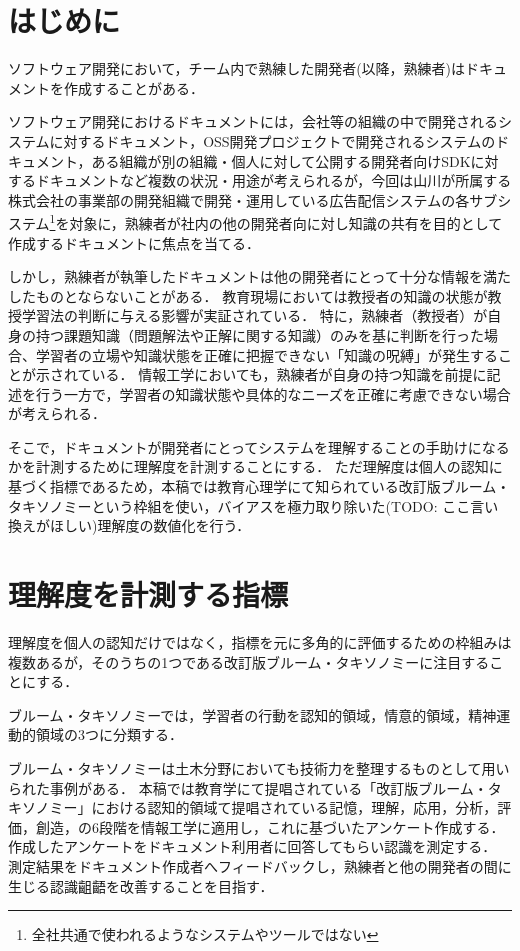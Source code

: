 \section{はじめに}
ソフトウェア開発において，チーム内で熟練した開発者(以降，熟練者)はドキュメントを作成することがある．\cite{bib:ozawa}

ソフトウェア開発におけるドキュメントには，会社等の組織の中で開発されるシステムに対するドキュメント，OSS開発プロジェクトで開発されるシステムのドキュメント，ある組織が別の組織・個人に対して公開する開発者向けSDKに対するドキュメントなど複数の状況・用途が考えられるが，今回は山川が所属する株式会社の事業部の開発組織で開発・運用している広告配信システムの各サブシステム\footnote{全社共通で使われるようなシステムやツールではない}を対象に，熟練者が社内の他の開発者向に対し知識の共有を目的として作成するドキュメントに焦点を当てる．

しかし，熟練者が執筆したドキュメントは他の開発者にとって十分な情報を満たしたものとならないことがある．
教育現場においては教授者の知識の状態が教授学習法の判断に与える影響が実証されている\cite{bib:kaneda}．
特に，熟練者（教授者）が自身の持つ課題知識（問題解法や正解に関する知識）のみを基に判断を行った場合、学習者の立場や知識状態を正確に把握できない「知識の呪縛」が発生することが示されている．
情報工学においても，熟練者が自身の持つ知識を前提に記述を行う一方で，学習者の知識状態や具体的なニーズを正確に考慮できない場合が考えられる．

そこで，ドキュメントが開発者にとってシステムを理解することの手助けになるかを計測するために理解度を計測することにする．
ただ理解度は個人の認知に基づく指標であるため，本稿では教育心理学にて知られている改訂版ブルーム・タキソノミー\cite{bib:nakao}という枠組を使い，バイアスを極力取り除いた(TODO: ここ言い換えがほしい)理解度の数値化を行う．

\section{理解度を計測する指標}
理解度を個人の認知だけではなく，指標を元に多角的に評価するための枠組みは複数あるが，そのうちの1つである改訂版ブルーム・タキソノミーに注目することにする．

ブルーム・タキソノミーでは，学習者の行動を認知的領域，情意的領域，精神運動的領域の3つに分類する．


ブルーム・タキソノミーは土木分野においても技術力を整理するものとして用いられた事例がある．\cite{bib:miyahara}
本稿では教育学にて提唱されている「改訂版ブルーム・タキソノミー」における認知的領域て提唱されている記憶，理解，応用，分析，評価，創造，の6段階を情報工学に適用し，これに基づいたアンケート作成する．
作成したアンケートをドキュメント利用者に回答してもらい認識を測定する．
測定結果をドキュメント作成者へフィードバックし，熟練者と他の開発者の間に生じる認識齟齬を改善することを目指す．

